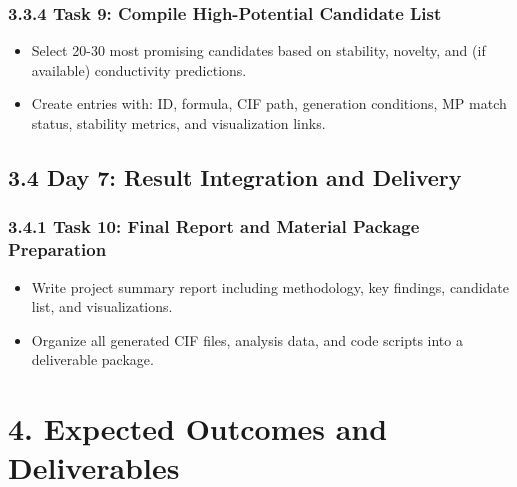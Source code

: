 \documentclass[letterpaper]{article} %
\begin{document}
\subsubsection{3.3.4 Task 9: Compile High-Potential Candidate List}
\begin{itemize}
    \item Select 20-30 most promising candidates based on stability, novelty, and (if available) conductivity predictions.
    \item Create entries with: ID, formula, CIF path, generation conditions, MP match status, stability metrics, and visualization links.
\end{itemize}

\subsection{3.4 Day 7: Result Integration and Delivery}

\subsubsection{3.4.1 Task 10: Final Report and Material Package Preparation}
\begin{itemize}
    \item Write project summary report including methodology, key findings, candidate list, and visualizations.
    \item Organize all generated CIF files, analysis data, and code scripts into a deliverable package.
\end{itemize}


\section{4. Expected Outcomes and Deliverables}
\end{document}

